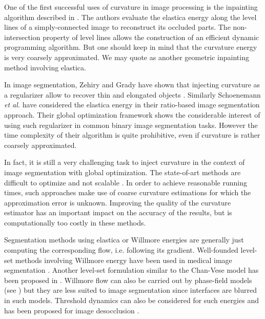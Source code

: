 \documentclass[runningheads]{llncs}
\begin{document}
One of the first successful uses of curvature in image processing is
the inpainting algorithm described in \cite{masnou98inpainting}. The
authors evaluate the elastica energy along the level lines of a
simply-connected image to reconstruct its occluded parts. The
non-intersection property of level lines allows the construction of an
efficient dynamic programming algorithm. But one should keep in mind
that the curvature energy is very coarsely approximated. We may quote
\cite{chan02elasticainpainting} as another geometric inpainting method
involving elastica.

In image segmentation, Zehiry and Grady have shown that injecting
curvature as a regularizer allow to recover thin and elongated objects
\cite{zehiry10fast}. Similarly Schoenemann {\em et al.}
\cite{schoenemann09linear} have considered the elastica energy in
their ratio-based image segmentation approach. Their global
optimization framework shows the considerable interest of using such
regularizer in common binary image segmentation tasks. However the
time complexity of their algorithm is quite prohibitive, even if
curvature is rather coarsely approximated. 

In fact, it is still a very challenging task to inject curvature in
the context of image segmentation with global optimization.  The
state-of-art methods are difficult to optimize and not scalable
\cite{zehiry10fast,schoenemann09linear,strandmark11globalframework,nieuwenhuis14efficient}. In
order to achieve reasonable running times, such approaches make use of
coarse curvature estimations for which the approximation error is
unknown. Improving the quality of the curvature estimator has an
important impact on the accuracy of the results, but is
computationally too costly in these methods.

Segmentation methods using elastica or Willmore energies are generally
just computing the corresponding flow, i.e. following its
gradient. Well-founded level-set methods involving Willmore energy
\cite{droske2004level} have been used in medical image segmentation
\cite{lim2012introducing}. Another level-set formulation similar to
the Chan-Vese model has been proposed in \cite{zhu2013image}. Willmore
flow can also be carried out by phase-field models (see
\cite{bretin2015phase}) but they are less suited to image segmentation
since interfaces are blurred in such models. Threshold dynamics can
also be considered for such energies \cite{esedoglu2008threshold} and
has been proposed for image desocclusion \cite{esedoglu2005threshold}.
\end{document}

